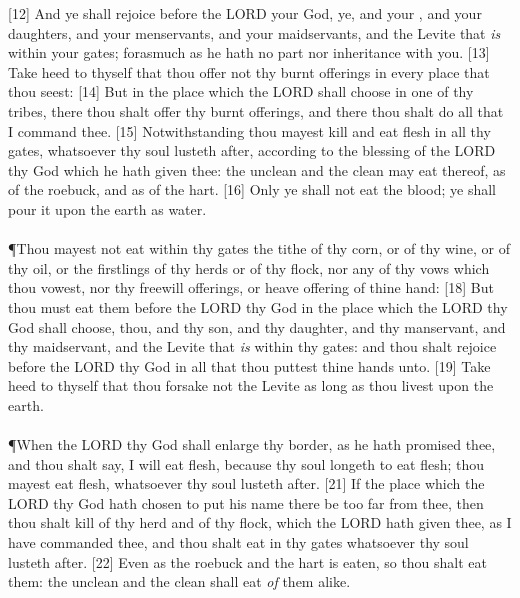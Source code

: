 [12] \textcolor[cmyk]{0.99998,1,0,0}{And ye shall rejoice before the LORD your God, ye, and your , and your daughters, and your menservants, and your maidservants, and the Levite that \emph{is} within your gates; forasmuch as he hath no part nor inheritance with you.}
[13] \textcolor[cmyk]{0.99998,1,0,0}{Take heed to thyself that thou offer not thy burnt offerings in every place that thou seest:}
[14] \textcolor[cmyk]{0.99998,1,0,0}{But in the place which the LORD shall choose in one of thy tribes, there thou shalt offer thy burnt offerings, and there thou shalt do all that I command thee.}
[15] \textcolor[cmyk]{0.99998,1,0,0}{Notwithstanding thou mayest kill and eat flesh in all thy gates, whatsoever thy soul lusteth after, according to the blessing of the LORD thy God which he hath given thee: the unclean and the clean may eat thereof, as of the roebuck, and as of the hart.}
[16] \textcolor[cmyk]{0.99998,1,0,0}{Only ye shall not eat the blood; ye shall pour it upon the earth as water.}\\
\\
\P \textcolor[cmyk]{0.99998,1,0,0}{Thou mayest not eat within thy gates the tithe of thy corn, or of thy wine, or of thy oil, or the firstlings of thy herds or of thy flock, nor any of thy vows which thou vowest, nor thy freewill offerings, or heave offering of thine hand:}
[18] \textcolor[cmyk]{0.99998,1,0,0}{But thou must eat them before the LORD thy God in the place which the LORD thy God shall choose, thou, and thy son, and thy daughter, and thy manservant, and thy maidservant, and the Levite that \emph{is} within thy gates: and thou shalt rejoice before the LORD thy God in all that thou puttest thine hands unto.}
[19] \textcolor[cmyk]{0.99998,1,0,0}{Take heed to thyself that thou forsake not the Levite as long as thou livest upon the earth.}\\
\\
\P \textcolor[cmyk]{0.99998,1,0,0}{When the LORD thy God shall enlarge thy border, as he hath promised thee, and thou shalt say, I will eat flesh, because thy soul longeth to eat flesh; thou mayest eat flesh, whatsoever thy soul lusteth after.}
[21] \textcolor[cmyk]{0.99998,1,0,0}{If the place which the LORD thy God hath chosen to put his name there be too far from thee, then thou shalt kill of thy herd and of thy flock, which the LORD hath given thee, as I have commanded thee, and thou shalt eat in thy gates whatsoever thy soul lusteth after.}
[22] \textcolor[cmyk]{0.99998,1,0,0}{Even as the roebuck and the hart is eaten, so thou shalt eat them: the unclean and the clean shall eat \emph{of} them alike.}
